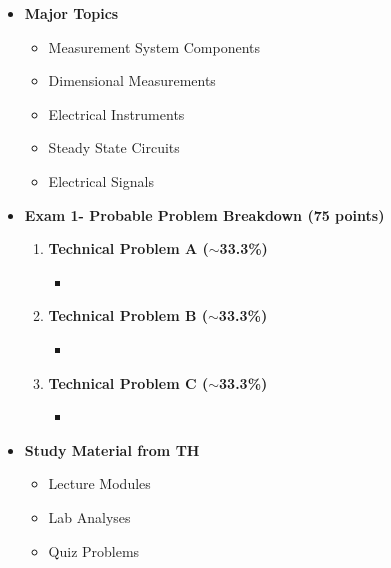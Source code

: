 \documentclass[11pt]{article}
\newcommand{\EXAMNUM}{1\hspace{0mm}}
\begin{document}
\begin{itemize}
\newpage

\item\textbf{\Large Major Topics}\\
	\begin{itemize}

		\item  {\large Measurement System Components}
		\item  {\large Dimensional Measurements}
        \item  {\large Electrical Instruments}
		\item  {\large Steady State Circuits}
        \item  {\large Electrical Signals}
		

	\end{itemize}


%
\item  \textbf{\Large Exam \EXAMNUM  - Probable Problem Breakdown (75 points) }\\
\Large
	\begin{enumerate}


		\item  \textbf{\Large Technical Problem A ($\sim$33.3\%)}\\
		\begin{itemize}
			\item 
		\end{itemize}
		\item  \textbf{\Large Technical Problem B ($\sim$33.3\%)}\\
		\begin{itemize}
			\item 
		\end{itemize}
		\item  \textbf{\Large Technical Problem C ($\sim$33.3\%)}\\
		\begin{itemize}
			\item 

		\end{itemize}

	\end{enumerate}

\item  \textbf{\Large Study Material from TH}\\
\begin{itemize}

\item Lecture Modules

\item Lab Analyses 

\item Quiz Problems

\end{itemize}

\end{itemize}


	
\end{document}
